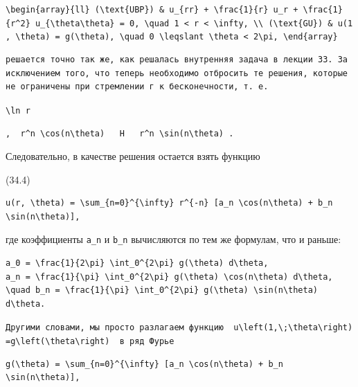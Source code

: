 \documentclass[
  ukrainian,
]{article}
\begin{document}
\texttt{\textbackslash{}begin\{array\}\{ll\}\ (\textbackslash{}text\{UBP\})\ \&\ u\_\{rr\}\ +\ \textbackslash{}frac\{1\}\{r\}\ u\_r\ +\ \textbackslash{}frac\{1\}\{r\^{}2\}\ u\_\{\textbackslash{}theta\textbackslash{}theta\}\ =\ 0,\ \textbackslash{}quad\ 1\ \textless{}\ r\ \textless{}\ \textbackslash{}infty,\ \textbackslash{}\textbackslash{}\ (\textbackslash{}text\{GU\})\ \&\ u(1,\ \textbackslash{}theta)\ =\ g(\textbackslash{}theta),\ \textbackslash{}quad\ 0\ \textbackslash{}leqslant\ \textbackslash{}theta\ \textless{}\ 2\textbackslash{}pi,\ \textbackslash{}end\{array\}}

\begin{verbatim}
решается точно так же, как решалась внутренняя задача в лекции 33. За исключением того, что теперь необходимо отбросить те решения, которые не ограничены при стремлении г к бесконечности, т. е.
\end{verbatim}

\texttt{\textbackslash{}ln\ r}

\texttt{,\ \ \textquotesingle{}r\^{}n\ \textbackslash{}cos(n\textbackslash{}theta)\textquotesingle{}\ \ \ \textquotesingle{}H\textquotesingle{}\ \ \ \textquotesingle{}r\^{}n\ \textbackslash{}sin(n\textbackslash{}theta)\textquotesingle{}\ .}

Следовательно, в качестве решения остается взять функцию

(34.4)

\begin{verbatim}
u(r, \theta) = \sum_{n=0}^{\infty} r^{-n} [a_n \cos(n\theta) + b_n \sin(n\theta)],
\end{verbatim}

где коэффициенты \texttt{a\_n} и \texttt{b\_n} вычисляются по тем же
формулам, что и раньше:

\begin{verbatim}
a_0 = \frac{1}{2\pi} \int_0^{2\pi} g(\theta) d\theta,
a_n = \frac{1}{\pi} \int_0^{2\pi} g(\theta) \cos(n\theta) d\theta, \quad b_n = \frac{1}{\pi} \int_0^{2\pi} g(\theta) \sin(n\theta) d\theta.
\end{verbatim}

\texttt{Другими\ словами,\ мы\ просто\ разлагаем\ функцию\ \ \textquotesingle{}u\textbackslash{}left(1,\textbackslash{};\textbackslash{}theta\textbackslash{}right)=g\textbackslash{}left(\textbackslash{}theta\textbackslash{}right)\textquotesingle{}\ \ в\ ряд\ Фурье}

\begin{verbatim}
g(\theta) = \sum_{n=0}^{\infty} [a_n \cos(n\theta) + b_n \sin(n\theta)],
\end{verbatim}
\end{document}
